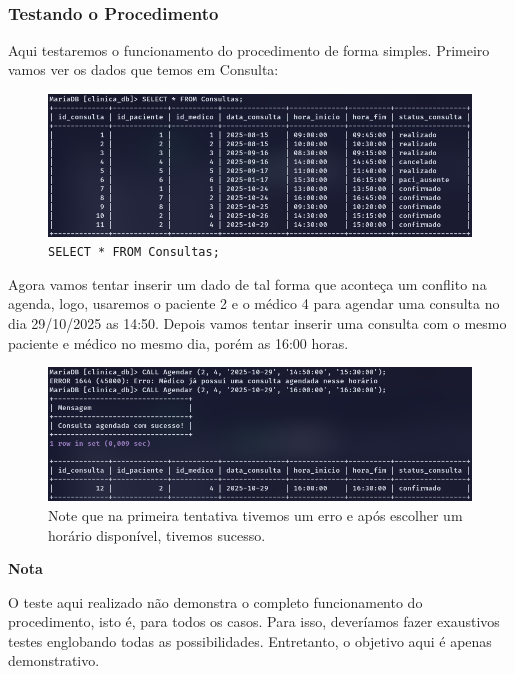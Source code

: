 \
\subsubsection{Testando o Procedimento}

Aqui testaremos o funcionamento do procedimento de forma simples. Primeiro vamos ver os dados que temos em Consulta:

\begin{figure}[H]
    \centering
    \includegraphics[width=0.8\linewidth]{Text//Proc/select_consulta.png}
    \caption{\texttt{SELECT * FROM Consultas;}}
    \label{fig:select_consulta}
\end{figure}

Agora vamos tentar inserir um dado de tal forma que aconteça um conflito na agenda, logo, usaremos o paciente 2 e o médico 4 para agendar uma consulta no dia 29/10/2025 as 14:50.
Depois vamos tentar inserir uma consulta com o mesmo paciente e médico no mesmo dia, porém as 16:00 horas.

\begin{figure}[H]
    \centering
    \includegraphics[width=1\linewidth]{Text//Proc/sucesso.png}
    \caption{Note que na primeira tentativa tivemos um erro e após escolher um horário disponível, tivemos sucesso.}
\end{figure}

\begin{alertbox}
    \begin{center}
        \textbf{Nota}
    \end{center}
    O teste aqui realizado não demonstra o completo funcionamento do procedimento, isto é, para todos os casos. Para isso, deveríamos fazer exaustivos testes englobando todas as possibilidades. Entretanto, o objetivo aqui é apenas demonstrativo.
\end{alertbox}

